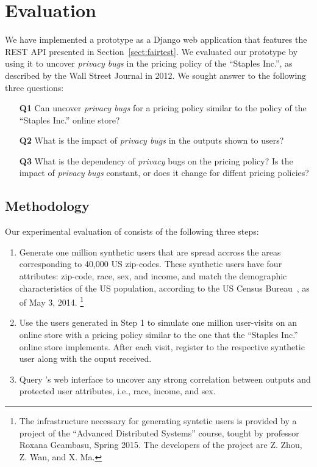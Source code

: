 \section{Evaluation}
\label{sect:evaluation}

We have implemented a \sysname prototype as a Django web application
that features the REST API presented in Section~\ref{sect:fairtest}.
We evaluated our prototype by using it to uncover {\it privacy bugs}
in the pricing policy of the ``Staples Inc.'', as described by the
Wall Street Journal in 2012. We sought answer to the following three
questions:

\begin{enumerate}
  \item[{\bf Q1}] Can \sysname uncover {\em privacy bugs} for
    a pricing policy similar to the policy of the ``Staples Inc.''
    online store?
  \item[{\bf Q2}] What is the impact of {\em privacy bugs} in the outputs
    shown to users?
  \item[{\bf Q3}] What is the dependency of {\em privacy} bugs on the
    pricing policy? Is the impact of {\em privacy bugs} constant,
    or does it change for diffent pricing policies?
\end{enumerate}

\subsection{\normalsize Methodology}
Our experimental evaluation of \sysname consists of the following three steps:

\begin{enumerate}
  \item
  Generate one million synthetic users that are spread accross the
  areas corresponding to 40,000 US zip-codes. These synthetic users
  have four attributes: zip-code, race, sex, and income, and match
  the demographic characteristics of the US population, according to
  the US Census Bureau~\cite{CensusBureau}, as of May 3, 2014.
  \footnote{
    The infrastructure necessary for generating syntetic users is
    provided by a project of the ``Advanced Distributed Systems'' course,
    tought by professor Roxana Geambasu, Spring 2015. The developers of the
    project are Z. Zhou, Z. Wan, and X. Ma.
  }

  \item
  Use the users generated in Step 1 to simulate one million user-visits on
  an online store with a pricing policy similar to the one that the
  ``Staples Inc.'' online store implements. After each visit,
  register to \sysname the respective synthetic user along with the ouput
  received.

  \item
  Query \sysname's web interface to uncover any strong correlation between
  outputs and protected user attributes, i.e., race, income, and sex.
\end{enumerate}


